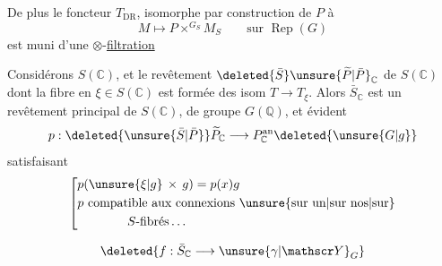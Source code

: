 De plus le foncteur $T_{\mathrm{DR}}$, isomorphe par construction de $P$ à
\[
M\longmapsto P\mathbin{\times}^{G_S}M_S\qquad\text{sur }\operatorname{Rep}(G)
\]
est muni d'une $\otimes$-\uline{filtration}

 Considérons $S(\mathbb C)$, et le revêtement $\deleted{\bar S}\unsure{\widetilde P|\bar P}_{\mathbb C}$ de $S(\mathbb C)$ dont la fibre en $\xi\in S(\mathbb C)$ est formée des isom $T\longrightarrow T_{\xi}$. Alors $\bar S_{\mathbb C}$ est un revêtement principal de $S(\mathbb C)$, de groupe $G(\mathbb Q)$,  et      évident
\[
p:\deleted{\unsure{\bar S|\bar P}}\widetilde P_{\mathbb C}
\longrightarrow P_{\mathbb C}^{\mathrm{an}}\deleted{\unsure{G|g}}
\]
satisfaisant
\[
\left[\begin{aligned}
&p(\unsure{\xi|g}\,\times\,g)=p(x)g\\
&p\ \text{compatible aux connexions \unsure{sur un|sur nos|sur}}\\
&\hspace{4em}S\text{-fibrés}\ldots
\end{aligned}\right.
\]

\[
\deleted{f:\bar S_{\mathbb C}\longrightarrow\unsure{\gamma|\mathscr Y}_{G}}
\]





